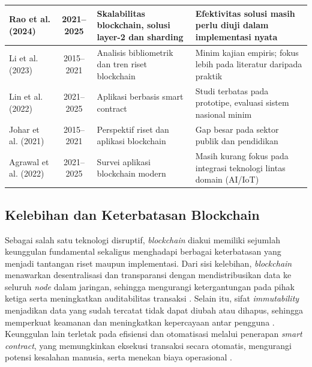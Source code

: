 \begin{table}[ht]
{\begin{tabular}{|l|c|p{5cm}|p{6cm}|}
Rao et al. (2024) \cite{rao2024} & 2021--2025 & Skalabilitas blockchain, solusi layer-2 dan sharding & Efektivitas solusi masih perlu diuji dalam implementasi nyata \\ \hline
Li et al. (2023) \cite{li2023} & 2015--2021 & Analisis bibliometrik dan tren riset blockchain & Minim kajian empiris; fokus lebih pada literatur daripada praktik \\ \hline
Lin et al. (2022) \cite{lin2022} & 2021--2025 & Aplikasi berbasis smart contract & Studi terbatas pada prototipe, evaluasi sistem nasional minim \\ \hline
Johar et al. (2021) \cite{johar2021} & 2015--2021 & Perspektif riset dan aplikasi blockchain & Gap besar pada sektor publik dan pendidikan \\ \hline
Agrawal et al. (2022) \cite{agrawal2022} & 2021--2025 & Survei aplikasi blockchain modern & Masih kurang fokus pada integrasi teknologi lintas domain (AI/IoT) \\ \hline
\end{tabular}}
\end{table}

\subsection{Kelebihan dan Keterbatasan Blockchain}

Sebagai salah satu teknologi disruptif, \textit{blockchain} diakui memiliki sejumlah keunggulan fundamental sekaligus menghadapi berbagai keterbatasan yang menjadi tantangan riset maupun implementasi. Dari sisi kelebihan, \textit{blockchain} menawarkan desentralisasi dan transparansi dengan mendistribusikan data ke seluruh \textit{node} dalam jaringan, sehingga mengurangi ketergantungan pada pihak ketiga serta meningkatkan auditabilitas transaksi \cite{ahmed2025, akhtar2025, mayani2025, monrat2019, guo2022, walia2025}. Selain itu, sifat \textit{immutability} menjadikan data yang sudah tercatat tidak dapat diubah atau dihapus, sehingga memperkuat keamanan dan meningkatkan kepercayaan antar pengguna \cite{ahmed2025, akhtar2025, monrat2019, guo2022, paul2024, dong2023, hardas2024}. Keunggulan lain terletak pada efisiensi dan otomatisasi melalui penerapan \textit{smart contract}, yang memungkinkan eksekusi transaksi secara otomatis, mengurangi potensi kesalahan manusia, serta menekan biaya operasional \cite{ahmed2025, akhtar2025, paul2024, hardas2024}.

